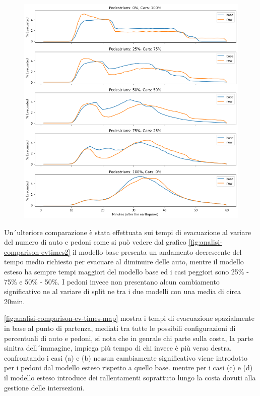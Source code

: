 \begin{figure}
    \centering
    \includegraphics[width=\textwidth]{images/analisi/comparison-evtimes.png}
    \caption{}
    \label{fig:analisi-comparison-evtimes}
\end{figure}


Un´ulteriore comparazione è stata effettuata sui tempi di evacuazione al variare del numero di auto e pedoni
come si può vedere dal grafico \ref*{fig:analisi-comparison-evtimes2} il modello base presenta
un andamento decrescente del tempo medio richiesto per evacuare al diminuire delle auto, 
mentre il modello esteso ha sempre tempi maggiori del modello base ed i casi peggiori sono 25\% - 75\% e 50\% - 50\%.
I pedoni invece non presentano alcun cambiamento significativo ne al variare di split ne tra i due modelli con una media di circa 20min.

\ref*{fig:analisi-comparison-ev-times-map} mostra i tempi di evacuazione spazialmente in base al punto di partenza,
mediati tra tutte le possibili configurazioni di percentuali di auto e pedoni, si nota che in genrale chi parte sulla costa, la parte sinitra dell´immagine,
impiega più tempo di chi invece è più verso destra.
confrontando i casi (a) e (b) nessun cambiamente significativo viene introdotto per i pedoni dal modello esteso rispetto a quello base.
mentre per i casi (c) e (d) il modello esteso introduce dei rallentamenti soprattuto lungo la costa dovuti alla gestione delle intersezioni.

